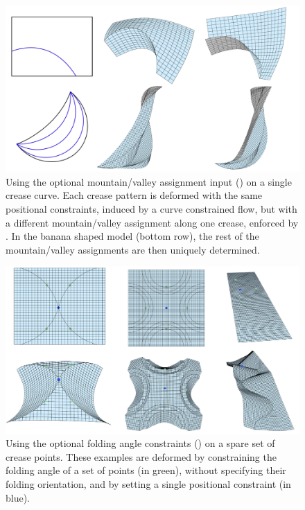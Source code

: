 \begin{figure} [h]
	\centering
	\includegraphics[width=\linewidth]{figures/MV_bias_modeling}
	\caption{Using the optional mountain/valley assignment input () on a single crease curve. Each crease pattern is deformed with the same positional constraints, induced by a curve constrained flow, but with a different mountain/valley assignment along one crease, enforced by . In the banana shaped model (bottom row), the rest of the mountain/valley assignments are then uniquely determined.}
	\label{fig:MV_bias_modeling}
\end{figure}

\begin{figure} [h]
	\centering
	\includegraphics[width=\linewidth]{figures/dihedral_editing}
	\caption{Using the optional folding angle constraints () on a spare set of crease points. These examples are deformed by constraining the folding angle of a set of points (in green), without specifying their folding orientation, and by setting a single positional constraint (in blue).}
	\label{fig:dihedral_editing}
\end{figure}